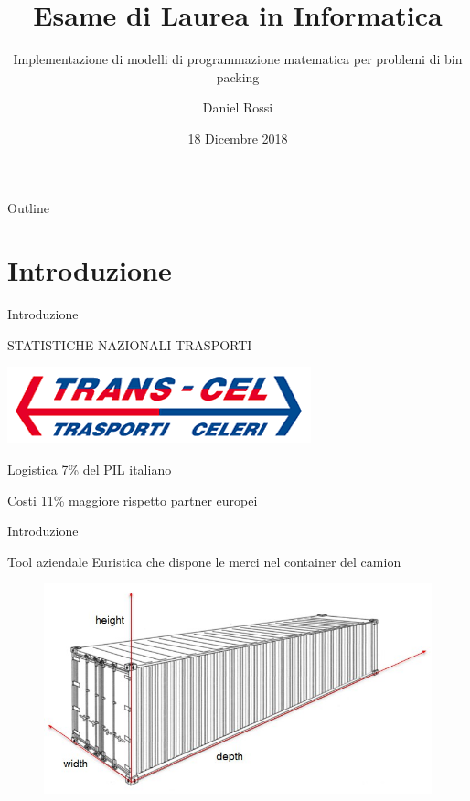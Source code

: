\documentclass{beamer}
\title{Esame di Laurea in Informatica}
\subtitle{Implementazione di modelli di programmazione matematica per problemi di bin packing}
\author{Daniel Rossi}
\date{18 Dicembre 2018}
\begin{document}
\maketitle

\begin{frame}{Outline}
	\tableofcontents
\end{frame}

\section{Introduzione}

\begin{frame}{Introduzione}
	\begin{minipage}[c]{0.45\textwidth}
		\large{\uppercase{Statistiche nazionali trasporti}} \vspace{.5em}
	\end{minipage}
	\hfill
	\begin{minipage}[c]{0.45\textwidth}
		\includegraphics[width=\textwidth]{figures/logo}
	\end{minipage}
	\begin{block}{Logistica}
		7\% del PIL italiano
	\end{block}
	\begin{block}{Costi}
		11\% maggiore rispetto partner europei
	\end{block}
\end{frame}

\begin{frame}{Introduzione}
	\begin{block}{Tool aziendale}
		Euristica che dispone le merci nel container del camion
	\end{block}
	\begin{figure}[H]
		\begin{center} \includegraphics[scale=0.5]{figures/photo5805353100838547063}
		\end{center}
	\end{figure}
\end{frame}
\end{document}

